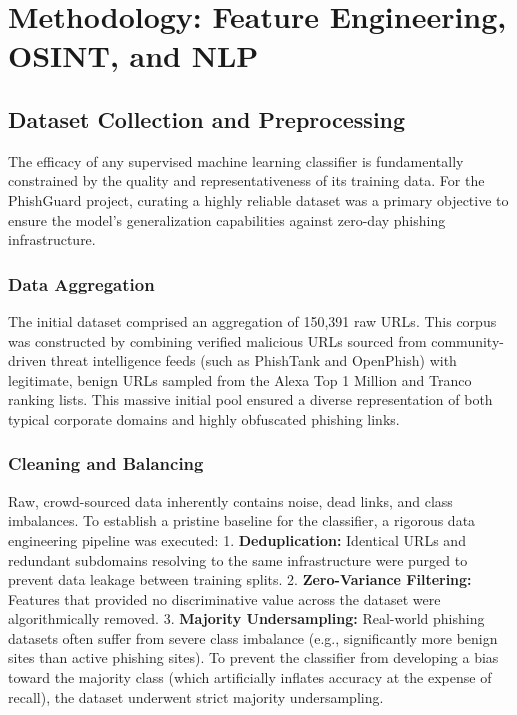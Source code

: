 \chapter{Methodology: Feature Engineering, OSINT, and NLP}
\label{methodology}

\section{Dataset Collection and
Preprocessing}\label{dataset-collection-and-preprocessing}

The efficacy of any supervised machine learning classifier is
fundamentally constrained by the quality and representativeness of its
training data. For the PhishGuard project, curating a highly reliable
dataset was a primary objective to ensure the model's generalization
capabilities against zero-day phishing infrastructure.

\subsection{Data Aggregation}\label{data-aggregation}

The initial dataset comprised an aggregation of 150,391 raw URLs. This
corpus was constructed by combining verified malicious URLs sourced from
community-driven threat intelligence feeds (such as PhishTank and
OpenPhish) with legitimate, benign URLs sampled from the Alexa Top 1
Million and Tranco ranking lists. This massive initial pool ensured a
diverse representation of both typical corporate domains and highly
obfuscated phishing links.

\subsection{Cleaning and Balancing}\label{cleaning-and-balancing}

Raw, crowd-sourced data inherently contains noise, dead links, and class
imbalances. To establish a pristine baseline for the classifier, a
rigorous data engineering pipeline was executed: 1.
\textbf{Deduplication:} Identical URLs and redundant subdomains
resolving to the same infrastructure were purged to prevent data leakage
between training splits. 2. \textbf{Zero-Variance Filtering:} Features
that provided no discriminative value across the dataset were
algorithmically removed. 3. \textbf{Majority Undersampling:} Real-world
phishing datasets often suffer from severe class imbalance (e.g.,
significantly more benign sites than active phishing sites). To prevent
the classifier from developing a bias toward the majority class (which
artificially inflates accuracy at the expense of recall), the dataset
underwent strict majority undersampling.

